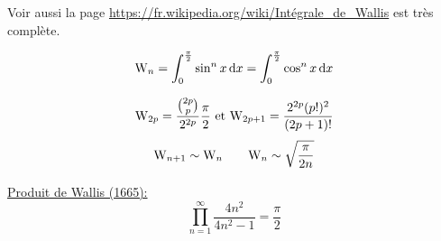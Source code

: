 Voir  aussi la page \url{https://fr.wikipedia.org/wiki/Intégrale_de_Wallis} est très complète. 

$$\mathrm{W}_n = \int_{0}^{\frac{\pi}{2}} \sin^n x \, \mathrm{d} x = \int_{0}^{\frac{\pi}{2}} \cos^n x \, \mathrm{d} x$$

\begin{prop}
    $$\mathrm{W}_{2p} = \frac{\binom{2p}{p}}{2^{2p}}\frac{\pi}{2} \text{ et } \mathrm{W}_{2p+1} = \frac{2^{2p} (p!)^2}{(2p+1)!}$$
    $$\mathrm{W}_{n+1} \sim \mathrm{W}_n \qquad \mathrm{W}_n \sim \sqrt{\frac{\pi}{2n}}$$
\end{prop}

\underline{Produit de Wallis (1665):}
$$\prod_{n=1}^{\infty} \frac{4n^2}{4n^2-1} = \frac{\pi}{2}$$